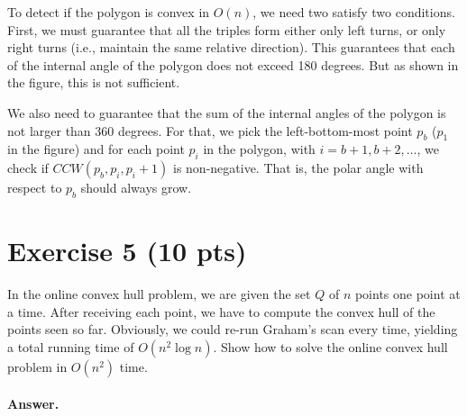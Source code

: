\documentclass[a4paper]{article}
\begin{document}
To detect if the polygon is convex in $O(n)$, we need two satisfy two conditions. First, we must guarantee that all the triples form either only left turns, or only right turns (i.e., maintain the same relative direction). This guarantees that each of the internal angle of the polygon does not exceed 180 degrees. But as shown in the figure, this is not sufficient.

We also need to guarantee that the sum of the internal angles of the polygon is not larger than 360 degrees. For that, we pick the left-bottom-most point $p_b$ ($p_1$ in the figure) and for each point $p_i$ in the polygon, with $i = b+1, b+2, \ldots$, we check if ${CCW}(p_b, p_i, p_i+1)$ is non-negative. That is, the polar angle with respect to $p_b$ should always grow.


\section*{Exercise 5 (10 pts)}

In the online convex hull problem, we are given the set $Q$ of $n$ points one point at a time. After receiving each point, we have to compute the convex hull of the points seen so far. Obviously, we could re-run Graham’s scan every time, yielding a total running time of $O(n^2 \log n)$. Show how to solve the online convex hull problem in $O(n^2)$ time.

\paragraph{Answer.}
\end{document}
